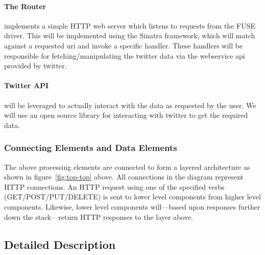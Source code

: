 \paragraph{The Router} implements a simple HTTP web server which listens to requests from
the FUSE driver. This will be implemented using the Sinatra framework, which
will match against a requested uri and invoke a specific handler. These handlers
will be responsible for fetching/manipulating the twitter data via the
webservice api provided by twitter.

\paragraph{Twitter API} will be leveraged to actually interact with the data as
requested by the user.  We will use an open source library for interacting with
twitter to get the required data.

\subsubsection{Connecting Elements and Data Elements}

The above processing elements are connected to form a layered architecture as
shown in figure~\ref{fig:top-top} above. All connections in the diagram
represent HTTP connections. An HTTP request using one of the specified verbs
(GET/POST/PUT/DELETE) is sent to lower level components from higher level
components. Likewise, lower level components will---based upon responses further
down the stack---return HTTP responses to the layer above.

\subsection{Detailed Description}
